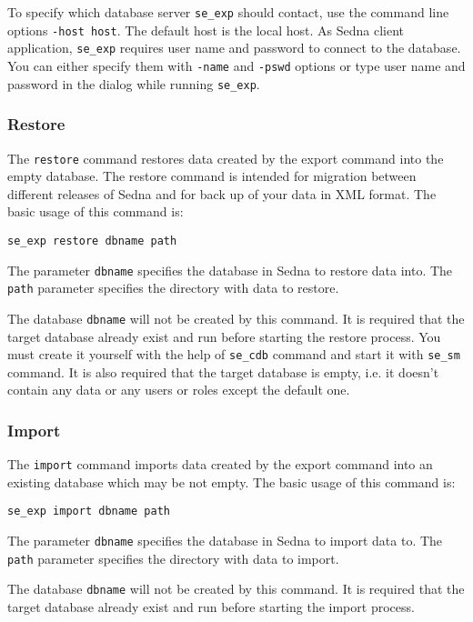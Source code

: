 \documentclass[a4paper,12pt]{article}
\begin{document}
To specify which database server \verb!se_exp! should contact, use the command
line options \verb!-host host!. The default host is the local host. As Sedna
client application, \verb!se_exp! requires user name and password to connect to
the database. You can either specify them with \verb!-name! and \verb!-pswd!
options or type user name and password in the dialog while running
\verb!se_exp!.


\subsubsection*{Restore}

The \verb!restore! command restores data created by the export command into the
empty database. The restore command is intended for migration between different
releases of Sedna and for back up of your data in XML format. The basic usage of
this command is:

\begin{verbatim}
se_exp restore dbname path
\end{verbatim}

The parameter \verb!dbname! specifies the database in Sedna to restore data
into. The \verb!path! parameter specifies the directory with data to restore.

The database \verb!dbname! will not be created by this command. It is required
that the target database already exist and run before starting the restore
process. You must create it yourself with the help of \verb!se_cdb! command and
start it with \verb!se_sm! command. It is also required that the target database
is empty, i.e. it doesn't contain any data or any users or roles except the
default one.


\subsubsection*{Import}

The \verb!import! command imports data created by the export command into an
existing database which may be not empty. The basic usage of this command is:

\begin{verbatim}
se_exp import dbname path
\end{verbatim}

The parameter \verb!dbname! specifies the database in Sedna to import data to.
The \verb!path! parameter specifies the directory with data to import.

The database \verb!dbname! will not be created by this command. It is required
that the target database already exist and run before starting the import
process.
\end{document}
